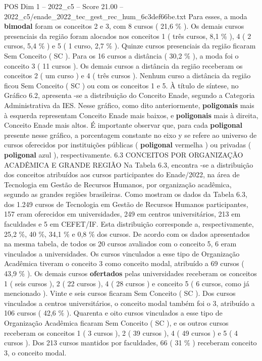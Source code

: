 \begin{textsample}{POS Dim 1 – 2022\_c5 – Score 21.00 – 2022\_c5/enade\_2022\_tec\_gest\_rec\_hum\_6c3def66be.txt}
Para esses, a moda \textbf{bimodal} foram os conceitos 2 e 3, com 8 cursos ( 21,6 \% ).
Os demais cursos presenciais da região foram alocados nos conceitos 1 ( três cursos, 8,1 \% ), 4 ( 2 cursos, 5,4 \% ) e 5 ( 1 curso, 2,7 \% ).
Quinze cursos presenciais da região ficaram Sem Conceito ( SC ).
Para os 16 cursos a distância ( 30,2 \% ), a moda foi o conceito 3 ( 11 cursos ).
Os demais cursos a distância da região receberam os conceitos 2 ( um curso ) e 4 ( três cursos ).
Nenhum curso a distância da região ficou Sem Conceito ( SC ) ou com os conceitos 1 e 5.
À título de síntese, no Gráfico 6.2, apresenta -se a distribuição do Conceito Enade, segundo a Categoria Administrativa da IES.
Nesse gráfico, como dito anteriormente, \textbf{poligonais} mais à esquerda representam Conceito Enade mais baixos, e \textbf{poligonais} mais à direita, Conceito Enade mais altos.
É importante observar que, para cada \textbf{poligonal} presente nesse gráfico, a porcentagem constante no eixo y se refere ao universo de cursos oferecidos por instituições públicas ( \textbf{poligonal} vermelha ) ou privadas ( \textbf{poligonal} azul ), respectivamente. 6.3 CONCEITOS POR ORGANIZAÇÃO ACADÊMICA E GRANDE REGIÃO Na Tabela 6.3, encontra -se a distribuição dos conceitos atribuídos aos cursos participantes do Enade/2022, na área de Tecnologia em Gestão de Recursos Humanos, por organização acadêmica, segundo as grandes regiões brasileiras.
Como mostram os dados da Tabela 6.3, dos 1.249 cursos de Tecnologia em Gestão de Recursos Humanos participantes, 157 eram oferecidos em universidades, 249 em centros universitários, 213 em faculdades e 5 em CEFET/IF.
Esta distribuição corresponde a, respectivamente, 25,2 \%, 40 \%, 34,1 \% e 0,8 \% dos cursos.
De acordo com os dados apresentados na mesma tabela, de todos os 20 cursos avaliados com o conceito 5, 6 eram vinculados a universidades.
Os cursos vinculados a esse tipo de Organização Acadêmica tiveram o conceito 3 como conceito modal, atribuído a 69 cursos ( 43,9 \% ).
Os demais cursos \textbf{ofertados} pelas universidades receberam os conceitos 1 ( seis cursos ), 2 ( 22 cursos ), 4 ( 28 cursos ) e conceito 5 ( 6 cursos, como já mencionado ).
Vinte e seis cursos ficaram Sem Conceito ( SC ).
Dos cursos vinculados a centros universitários, o conceito modal também foi o 3, atribuído a 106 cursos ( 42,6 \% ).
Quarenta e oito cursos vinculados a esse tipo de Organização Acadêmica ficaram Sem Conceito ( SC ), e os outros cursos receberam os conceitos 1 ( 3 cursos ), 2 ( 39 cursos ), 4 ( 49 cursos ) e 5 ( 4 cursos ).
Dos 213 cursos mantidos por faculdades, 66 ( 31 \% ) receberam conceito 3, o conceito modal.

\end{textsample}

